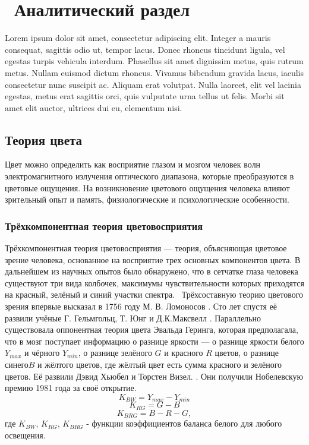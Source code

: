 \chapter{ Аналитический раздел}
\label{cha:analysis}

Lorem ipsum dolor sit amet, consectetur adipiscing elit. Integer a mauris consequat, sagittis odio ut, tempor lacus. Donec rhoncus tincidunt ligula, vel egestas turpis vehicula interdum. Phasellus sit amet dignissim metus, quis rutrum metus. Nullam euismod dictum rhoncus. Vivamus bibendum gravida lacus, iaculis consectetur nunc suscipit ac. Aliquam erat volutpat. Nulla laoreet, elit vel lacinia egestas, metus erat sagittis orci, quis vulputate urna tellus ut felis. Morbi sit amet elit auctor, ultrices dui eu, elementum nisi.



\section{Теория цвета}
Цвет можно определить как восприятие глазом и мозгом человек волн электромагнитного излучения оптического диапазона, которые преобразуются в цветовые ощущения. На возникновение цветового ощущения человека влияют зрительный опыт и память, физиологические и психологические особенности.

\subsection{Трёхкомпонентная теория цветовосприятия}
Трёхкомпонентная теория цветовосприятия — теория, объясняющая цветовое зрение человека, основанное на восприятие трех основных компонентов цвета. В дальнейшем из научных опытов было обнаружено, что в сетчатке глаза человека существуют три вида колбочек, максимумы чувствительности которых приходятся на красный, зелёный и синий участки спектра. \cite{bib1}  Трёхсоставную теорию цветового зрения впервые высказал в 1756 году М. В. Ломоносов \cite{bib2}. Сто лет спустя её развили учёные Г. Гельмгольц, Т. Юнг и Д.К.Максвелл \cite{bib3}. Параллельно существовала оппонентная теория цвета Эвальда Геринга, которая предполагала, что в мозг поступает информацию о разнице яркости — о разнице яркости белого $Y_{max}$  и чёрного $ Y_{min}$, о разнице зелёного $G$ и красного $R$ цветов, о разнице синего$B$ и жёлтого цветов, где жёлтый цвет есть сумма красного и зелёного цветов. Её развили Дэвид Хьюбел  и Торстен Визел.  \cite{bib4}. Они получили Нобелевскую премию 1981 года за своё открытие. 
\begin{equation}
 K_{BW} = Y_{max} - Y_{min} 
 \end{equation}
 \begin{equation}
 K_{RG}   = G - B
\end{equation}
 \begin{equation}
K_{BRG} = B - R - G, 
\end{equation}
 где $ K_{BW} $, $K_{RG}$, $K_{BRG} $ - функции коэффициентов баланса белого для любого освещения.

